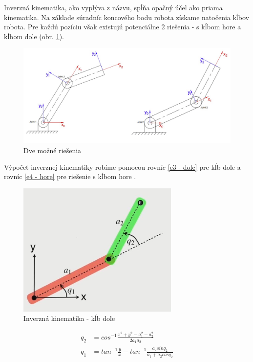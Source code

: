 Inverzná kinematika, ako vyplýva z názvu, spĺňa opačný účel ako priama kinematika. Na základe súradníc koncového bodu robota získame natočenia kĺbov robota. Pre každú pozíciu však existujú potenciálne 2 riešenia - s kĺbom hore a kĺbom dole (obr. \ref{OBRAZOK 4.10}). 

\begin{figure}[h]
	\centering
	\includegraphics[width=140mm]{img/IK-EUED.png}
	\caption{Dve možné riešenia \cite{FK}} \label{OBRAZOK 4.10} 
\end{figure} 

Výpočet inverznej kinematiky robíme pomocou rovníc  \ref{e3 - dole} pre kĺb dole  a rovníc \ref{e4 - hore} pre riešenie s kĺbom hore  \cite{IK}.

\begin{figure}[h]
	\centering
	\includegraphics[width=80mm]{img/IK1.png}
	\caption{ Inverzná kinematika - kĺb dole \cite{IK}} \label{OBRAZOK 4.11} 
\end{figure} 

\begin{equation}
	\begin{aligned}
		q_2&= cos^{-1} \frac{x^2 + y^2 - a_1^2 - a_2^2}{2 a_1 a_2 }\\
		q_1&=  tan^{-1} \frac{y}{x} - tan^{-1} \frac{a_2 sinq_2}{a_1 + a_2 cos q_2} \\
	\end{aligned}
	\label{e3 - dole} 
\end{equation}

